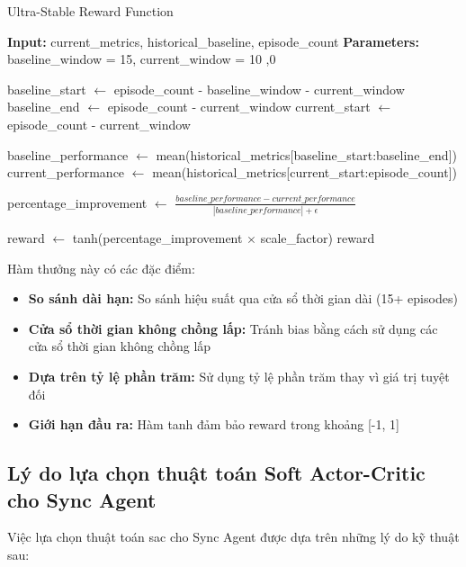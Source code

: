 \begin{algorithm}[!htp]
    \caption{Ultra-Stable Reward Function}
    \begin{algorithmic}[1]
        \State \textbf{Input:} current\_metrics, historical\_baseline, episode\_count 
        \State \textbf{Parameters:} baseline\_window = 15, current\_window = 10 
            ,0 
        \EndIf
        
        \State baseline\_start $\leftarrow$ episode\_count - baseline\_window - current\_window
        \State baseline\_end $\leftarrow$ episode\_count - current\_window
        \State current\_start $\leftarrow$ episode\_count - current\_window
        
        \State baseline\_performance $\leftarrow$ mean(historical\_metrics[baseline\_start:baseline\_end])
        \State current\_performance $\leftarrow$ mean(historical\_metrics[current\_start:episode\_count])
        
        \State percentage\_improvement $\leftarrow$ $\frac{baseline\_performance - current\_performance}{|baseline\_performance| + \epsilon}$
        
        \State reward $\leftarrow$ tanh(percentage\_improvement $\times$ scale\_factor)
        \Return reward
    \end{algorithmic}
\end{algorithm}

Hàm thưởng này có các đặc điểm:
\begin{itemize}
    \item \textbf{So sánh dài hạn:} So sánh hiệu suất qua cửa sổ thời gian
        dài (15+ episodes)

    \item \textbf{Cửa sổ thời gian không chồng lấp:} Tránh bias bằng cách sử dụng các cửa
        sổ thời gian không chồng lấp

    \item \textbf{Dựa trên tỷ lệ phần trăm:} Sử dụng tỷ lệ phần trăm thay vì giá trị
        tuyệt đối

    \item \textbf{Giới hạn đầu ra:} Hàm tanh đảm bảo reward trong khoảng [-1, 1]
\end{itemize}

\subsection{Lý do lựa chọn thuật toán Soft Actor-Critic cho Sync Agent}
Việc lựa chọn thuật toán \ac{sac} cho Sync Agent được dựa trên những lý do kỹ thuật sau:

